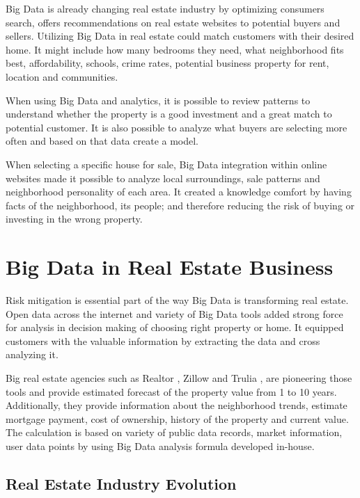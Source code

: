 \documentclass[sigconf]{acmart}
\begin{document}
Big Data is already changing real estate industry by optimizing consumers search, offers recommendations on real estate websites to potential buyers and sellers. Utilizing Big Data in real estate could match customers with their desired home. It might include how many bedrooms they need, what neighborhood fits best, affordability, schools, crime rates, potential business property for rent, location and communities.

When using Big Data and analytics, it is possible to review patterns to understand whether the property is a good investment and a great match to potential customer. It is also possible to analyze what buyers are selecting  more often and based on that data create a model.

When selecting a specific house for sale, Big Data integration within online websites made it possible to analyze local surroundings, sale patterns and neighborhood personality of each area. It created a knowledge comfort by having facts of the neighborhood, its people; and therefore reducing the risk of buying or investing in the wrong property. 

\section{Big Data in Real Estate Business}

Risk mitigation is essential part of the way Big Data is transforming real estate. Open data across the internet and variety of Big Data tools added strong force for analysis in decision making of choosing right property or home. It equipped customers with the valuable information by extracting the data and cross analyzing it.

Big real estate agencies such as Realtor \cite{realtor}, Zillow \cite{zillow} and Trulia \cite{trulia}, are pioneering those tools and provide estimated forecast of the property value from 1 to 10 years. Additionally, they provide information about the neighborhood trends, estimate mortgage payment, cost of ownership, history of the property and current value. The calculation is based on variety of public data records, market information, user data points \cite{zestimate} by using Big Data analysis formula developed in-house.

\subsection{Real Estate Industry Evolution}
\end{document}
